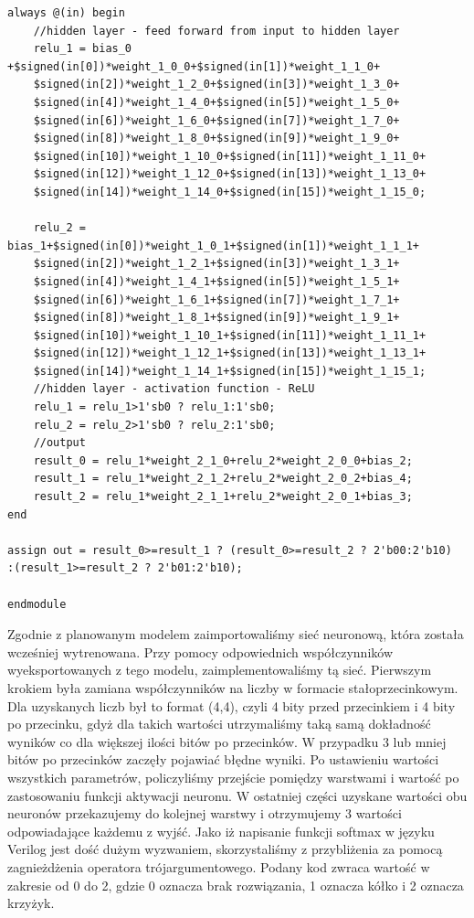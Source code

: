 \documentclass[a4paper, titleauthor]{mwart}
\begin{document}
\begin{lstlisting}
always @(in) begin
	//hidden layer - feed forward from input to hidden layer
	relu_1 = bias_0 +$signed(in[0])*weight_1_0_0+$signed(in[1])*weight_1_1_0+
    $signed(in[2])*weight_1_2_0+$signed(in[3])*weight_1_3_0+
    $signed(in[4])*weight_1_4_0+$signed(in[5])*weight_1_5_0+
    $signed(in[6])*weight_1_6_0+$signed(in[7])*weight_1_7_0+
    $signed(in[8])*weight_1_8_0+$signed(in[9])*weight_1_9_0+
    $signed(in[10])*weight_1_10_0+$signed(in[11])*weight_1_11_0+
    $signed(in[12])*weight_1_12_0+$signed(in[13])*weight_1_13_0+
    $signed(in[14])*weight_1_14_0+$signed(in[15])*weight_1_15_0;
	
	relu_2 = bias_1+$signed(in[0])*weight_1_0_1+$signed(in[1])*weight_1_1_1+
    $signed(in[2])*weight_1_2_1+$signed(in[3])*weight_1_3_1+
    $signed(in[4])*weight_1_4_1+$signed(in[5])*weight_1_5_1+
    $signed(in[6])*weight_1_6_1+$signed(in[7])*weight_1_7_1+
    $signed(in[8])*weight_1_8_1+$signed(in[9])*weight_1_9_1+ 
    $signed(in[10])*weight_1_10_1+$signed(in[11])*weight_1_11_1+
    $signed(in[12])*weight_1_12_1+$signed(in[13])*weight_1_13_1+
    $signed(in[14])*weight_1_14_1+$signed(in[15])*weight_1_15_1;
	//hidden layer - activation function - ReLU
	relu_1 = relu_1>1'sb0 ? relu_1:1'sb0;
	relu_2 = relu_2>1'sb0 ? relu_2:1'sb0;
	//output
	result_0 = relu_1*weight_2_1_0+relu_2*weight_2_0_0+bias_2;
	result_1 = relu_1*weight_2_1_2+relu_2*weight_2_0_2+bias_4;
	result_2 = relu_1*weight_2_1_1+relu_2*weight_2_0_1+bias_3;
end

assign out = result_0>=result_1 ? (result_0>=result_2 ? 2'b00:2'b10)
:(result_1>=result_2 ? 2'b01:2'b10);

endmodule

\end{lstlisting}
Zgodnie z planowanym modelem zaimportowaliśmy sieć neuronową, która została wcześniej wytrenowana. Przy pomocy odpowiednich współczynników wyeksportowanych z tego modelu, zaimplementowaliśmy tą sieć. Pierwszym krokiem była zamiana współczynników na liczby w formacie stałoprzecinkowym. Dla uzyskanych liczb był to format (4,4), czyli 4 bity przed przecinkiem i 4 bity po przecinku, gdyż dla takich wartości utrzymaliśmy taką samą dokładność wyników co dla większej ilości bitów po przecinków. W przypadku 3 lub mniej bitów po przecinków zaczęły pojawiać błędne wyniki. Po ustawieniu wartości wszystkich parametrów, policzyliśmy przejście pomiędzy warstwami i wartość po zastosowaniu funkcji aktywacji neuronu. W ostatniej części uzyskane wartości obu neuronów przekazujemy do kolejnej warstwy i otrzymujemy 3 wartości odpowiadające każdemu z wyjść. Jako iż napisanie funkcji softmax w języku Verilog jest dość dużym wyzwaniem, skorzystaliśmy z przybliżenia za pomocą zagnieżdżenia operatora trójargumentowego. Podany kod zwraca wartość w zakresie od 0 do 2, gdzie 0 oznacza brak rozwiązania, 1 oznacza kółko i 2 oznacza krzyżyk.
\end{document}
